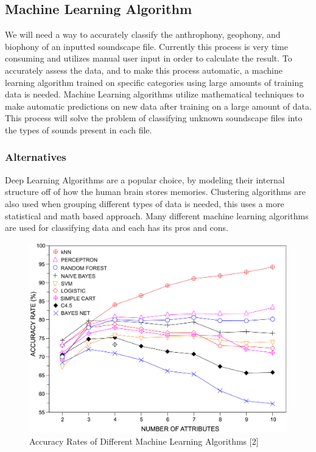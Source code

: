 \documentclass[12pt,journal,compsoc]{IEEEtran}
\newenvironment{subs}
  {\adjustwidth{1em}{0pt}}
  {\endadjustwidth}
\begin{document}
\begin{subs}
\subsection{Machine Learning Algorithm}
We will need a way to accurately classify the anthrophony, geophony, and biophony of an inputted soundscape file. Currently this process is very time consuming and utilizes manual user input in order to calculate the result. To accurately assess the data, and to make this process automatic, a machine learning algorithm trained on specific categories using large amounts of training data is needed. Machine Learning algorithms utilize mathematical techniques to make automatic predictions on new data after training on a large amount of data. This process will solve the problem of classifying unknown soundscape files into the types of sounds present in each file.

\begin{subs}
\subsubsection{Alternatives}
Deep Learning Algorithms are a popular choice, by modeling their internal structure off of how the human brain stores memories. Clustering algorithms are also used when grouping different types of data is needed, this uses a more statistical and math based approach. Many different machine learning algorithms are used for classifying data and each has its pros and cons.

\begin{subs}

\begin{figure}[H]
\centering
\includegraphics[width=5in]{images/accuracy_rate.png}
\caption{Accuracy Rates of Different Machine Learning Algorithms [2]}
\label{fig:accuracy_all}
\end{figure}


\end{subs}
\end{subs}
\end{subs}
\end{document}
